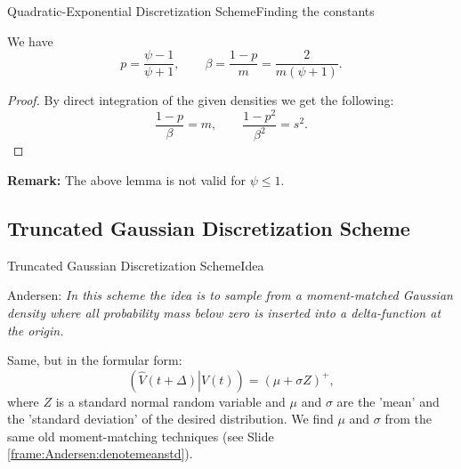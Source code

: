     \begin{frame}{Quadratic-Exponential Discretization Scheme}{Finding the constants}
        \begin{lemma}
            We have
            \begin{equation}
                p     = \frac{\psi - 1}{\psi + 1}, \qquad \beta = \frac{1-p}{m} = \frac{2}{m(\psi+1)}.
            \end{equation}
        \end{lemma}
        \begin{proof}
            By direct integration of the given densities we get the following:
            \begin{equation}
                \frac{1-p}{\beta} = m, \qquad \frac{1-p^2}{\beta^2} = s^2.
            \end{equation}
        \end{proof}
        \textbf{Remark:} The above lemma is not valid for $\psi \leq 1$.
    \end{frame}


\subsection{Truncated Gaussian Discretization Scheme}
    \begin{frame}{Truncated Gaussian Discretization Scheme}{Idea}
        \begin{block}{Andersen:}
            \emph{In this scheme the idea is to sample from a moment-matched Gaussian density where all probability
            mass below zero is inserted into a delta-function at the origin.}
        \end{block} 
        Same, but in the formular form:
        \begin{equation}
            \left(\left.\hat{V}(t+\Delta)\right| V(t)\right) = \left(\mu + \sigma Z\right)^+,
        \end{equation}
        where $Z$ is a standard normal random variable and $\mu$ and $\sigma$ are the 'mean' and the 'standard deviation' of the desired distribution.
        We find $\mu$ and $\sigma$ from the same old moment-matching techniques (see Slide \ref{frame:Andersen:denotemeanstd}).
    \end{frame}

